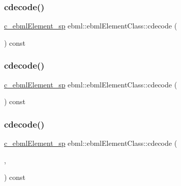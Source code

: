 \subsubsection{\texorpdfstring{cdecode()}{cdecode()}\hspace{0.1cm}{\footnotesize\ttfamily [1/6]}}
{\footnotesize\ttfamily \mbox{\hyperlink{namespaceebml_a2deef4e8071531b32e3533f1bf978917}{c\+\_\+ebml\+Element\+\_\+sp}} ebml\+::ebml\+Element\+Class\+::cdecode (\begin{DoxyParamCaption}\item[{const \mbox{\hyperlink{classebml_1_1parseString}{parse\+String}} \&}]{ }\end{DoxyParamCaption}) const}

\mbox{\label{classebml_1_1ebmlElementClass_a6a6432b7bf633821f27015e111928b15}} 
\subsubsection{\texorpdfstring{cdecode()}{cdecode()}\hspace{0.1cm}{\footnotesize\ttfamily [2/6]}}
{\footnotesize\ttfamily \mbox{\hyperlink{namespaceebml_a2deef4e8071531b32e3533f1bf978917}{c\+\_\+ebml\+Element\+\_\+sp}} ebml\+::ebml\+Element\+Class\+::cdecode (\begin{DoxyParamCaption}\item[{const \mbox{\hyperlink{classebml_1_1parseFile}{parse\+File}} \&}]{ }\end{DoxyParamCaption}) const}

\mbox{\label{classebml_1_1ebmlElementClass_ab365b1b7024bbf0dd625694a71f7e7ba}} 
\subsubsection{\texorpdfstring{cdecode()}{cdecode()}\hspace{0.1cm}{\footnotesize\ttfamily [3/6]}}
{\footnotesize\ttfamily \mbox{\hyperlink{namespaceebml_a2deef4e8071531b32e3533f1bf978917}{c\+\_\+ebml\+Element\+\_\+sp}} ebml\+::ebml\+Element\+Class\+::cdecode (\begin{DoxyParamCaption}\item[{const char $\ast$}]{,  }\item[{size\+\_\+t}]{ }\end{DoxyParamCaption}) const}

